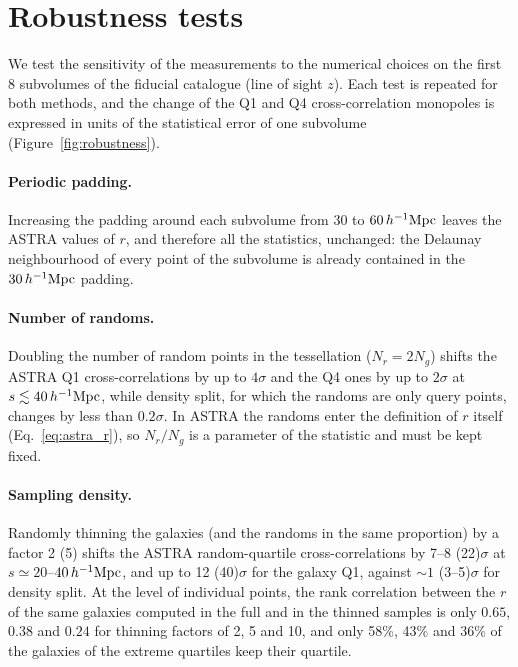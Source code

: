 \section{Robustness tests}
\label{sec:robustness}

We test the sensitivity of the measurements to the numerical choices on the first 8 subvolumes of the fiducial catalogue (line of sight $z$). Each test is repeated for both methods, and the change of the Q1 and Q4 cross-correlation monopoles is expressed in units of the statistical error of one subvolume (Figure~\ref{fig:robustness}).

\paragraph{Periodic padding.} Increasing the padding around each subvolume from 30 to $60\,h^{-1}\mathrm{Mpc}$ leaves the ASTRA values of $r$, and therefore all the statistics, unchanged: the Delaunay neighbourhood of every point of the subvolume is already contained in the $30\,h^{-1}\mathrm{Mpc}$ padding.

\paragraph{Number of randoms.} Doubling the number of random points in the tessellation ($N_r=2N_g$) shifts the ASTRA Q1 cross-correlations by up to $4\sigma$ and the Q4 ones by up to $2\sigma$ at $s\lesssim40\,h^{-1}\mathrm{Mpc}$, while density split, for which the randoms are only query points, changes by less than $0.2\sigma$. In ASTRA the randoms enter the definition of $r$ itself (Eq.~\ref{eq:astra_r}), so $N_r/N_g$ is a parameter of the statistic and must be kept fixed.

\paragraph{Sampling density.} Randomly thinning the galaxies (and the randoms in the same proportion) by a factor 2 (5) shifts the ASTRA random-quartile cross-correlations by 7--8 (22)$\sigma$ at $s\simeq20$--$40\,h^{-1}\mathrm{Mpc}$, and up to 12 (40)$\sigma$ for the galaxy Q1, against $\sim1$ (3--5)$\sigma$ for density split. At the level of individual points, the rank correlation between the $r$ of the same galaxies computed in the full and in the thinned samples is only $0.65$, $0.38$ and $0.24$ for thinning factors of 2, 5 and 10, and only 58\%, 43\% and 36\% of the galaxies of the extreme quartiles keep their quartile.


